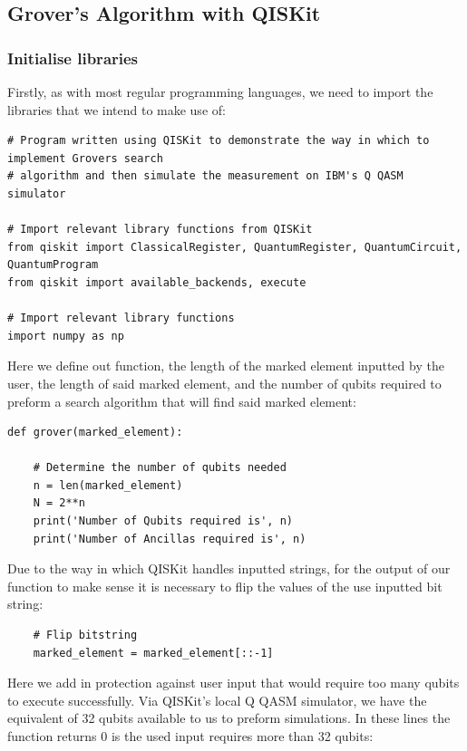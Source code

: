 
\subsection{Grover's Algorithm with QISKit}

\subsubsection{Initialise libraries}

Firstly, as with most regular programming languages, we need to import the libraries that we intend to make use of:

\begin{verbatim}
# Program written using QISKit to demonstrate the way in which to implement Grovers search 
# algorithm and then simulate the measurement on IBM's Q QASM simulator

# Import relevant library functions from QISKit
from qiskit import ClassicalRegister, QuantumRegister, QuantumCircuit, QuantumProgram
from qiskit import available_backends, execute

# Import relevant library functions 
import numpy as np
\end{verbatim}

Here we define out function, the length of the marked element inputted by the user, the length of said marked element, and the number of qubits required to preform a search algorithm that will find said marked element:

\begin{verbatim}
def grover(marked_element):
	
	# Determine the number of qubits needed
	n = len(marked_element)
	N = 2**n
	print('Number of Qubits required is', n)
	print('Number of Ancillas required is', n)
\end{verbatim}

Due to the way in which QISKit handles inputted strings, for the output of our function to make sense it is necessary to flip the values of the use inputted bit string:

\begin{verbatim}	
	# Flip bitstring
	marked_element = marked_element[::-1]
\end{verbatim}

Here we add in protection against user input that would require too many qubits to execute successfully. Via QISKit's local Q QASM simulator, we have the equivalent of 32 qubits available to us to preform simulations. In these lines the function returns 0 is the used input requires more than 32 qubits:


